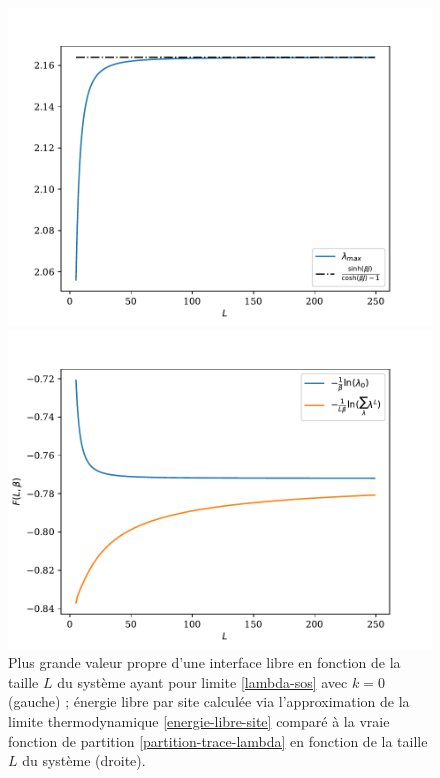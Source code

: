 \begin{figure}
	\begin{minipage}[t]{0.5\linewidth}
		\includegraphics[width=\linewidth]{chap4/freeene-lambda0.pdf}
	\end{minipage}%
	\begin{minipage}[t]{0.5\linewidth}
		\includegraphics[width=\linewidth]{chap4/freeene-thermo.pdf}
	\end{minipage}
	\caption{Plus grande valeur propre d'une interface libre en fonction de la taille $L$ du système  ayant pour limite \ref{lambda-sos} avec $k=0$ (gauche) ; énergie libre par site calculée via l'approximation de la limite thermodynamique \ref{energie-libre-site} comparé à la vraie fonction de partition \ref{partition-trace-lambda} en fonction de la taille $L$ du système (droite).}
\end{figure}  	


